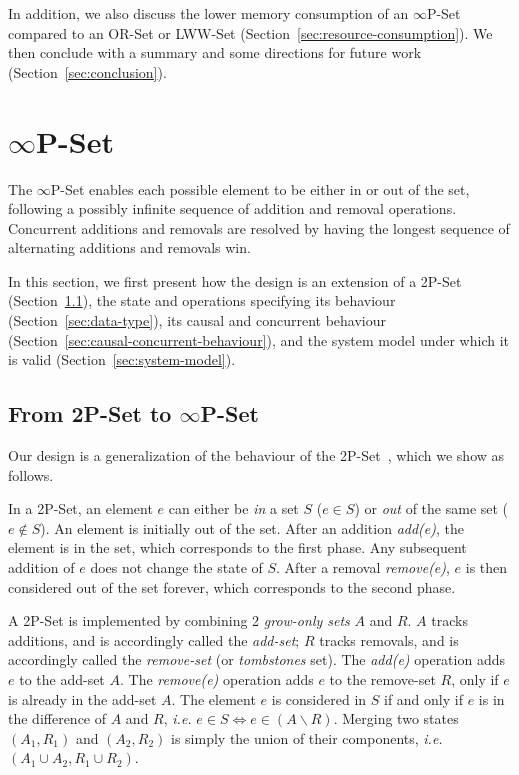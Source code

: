 \documentclass[9pt, oneside]{article}   	%
\begin{document}
In addition, we also discuss the lower memory consumption of an $\infty$P-Set compared to an OR-Set or LWW-Set (Section~\ref{sec:resource-consumption}). We then conclude with a summary and some directions for future work (Section~\ref{sec:conclusion}).

\section{$\infty$P-Set}
\label{sec:specification}

The $\infty$P-Set enables each possible element to be either in or out of the set, following a possibly infinite sequence of addition and removal operations. Concurrent additions and removals are resolved by having the longest sequence of alternating additions and removals win. 

In this section, we first present how the design is an extension of a 2P-Set (Section~\ref{sec:intuition}), the state and operations specifying its behaviour (Section~\ref{sec:data-type}), its causal and concurrent behaviour (Section~\ref{sec:causal-concurrent-behaviour}), and the system model under which it is valid (Section~\ref{sec:system-model}).

\subsection{From 2P-Set to $\infty$P-Set}
\label{sec:intuition}

Our design is a generalization of the behaviour of the 2P-Set~\cite{shapiro:inria-00555588}, which we show as follows. 

In a 2P-Set, an element $e$ can either be \textit{in} a set $S$ ($e \in S$) or \textit{out} of the same set ($e \notin S$). An element is initially out of the set. After an addition \textit{add(e)}, the element is in the set, which corresponds to the first phase. Any subsequent addition of $e$ does not change the state of $S$. After a removal \textit{remove(e)}, $e$ is then considered out of the set forever, which corresponds to the second phase.

A 2P-Set is implemented by combining 2 \textit{grow-only sets} $A$ and $R$. $A$ tracks additions, and is accordingly called the \textit{add-set}; $R$ tracks removals, and is accordingly called the \textit{remove-set} (or \textit{tombstones} set). The \textit{add(e)} operation adds $e$ to the add-set $A$. The \textit{remove(e)} operation adds $e$ to the remove-set $R$, only if $e$ is already in the add-set $A$. The element $e$ is considered in $S$ if and only if $e$ is in the difference of $A$ and $R$, \textit{i.e.} $e \in S \Leftrightarrow e \in (A\backslash R)$. Merging two states $(A_1, R_1)$ and $(A_2, R_2)$ is simply the union of their components, \textit{i.e.} $(A_1 \cup A_2, R_1 \cup R_2)$.
\end{document}

